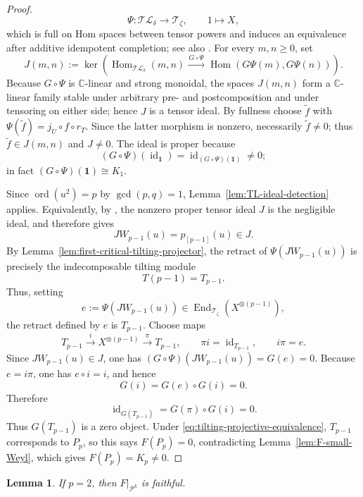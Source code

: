 \documentclass[12pt,leqno]{amsart}
\numberwithin{equation}{section}
\newtheorem{lem}[thm]{Lemma}
\newcommand{\End}{\operatorname{End}}
\newcommand{\Hom}{\operatorname{Hom}}
\newcommand{\id}{\operatorname{id}}
\newcommand{\TL}{\mathcal{TL}}
\def\C{\mathbb{C}}
\begin{document}
\begin{proof}
\begin{equation}
 \Psi:\TL_\delta\longrightarrow\mathcal T_\zeta,
 \qquad1\longmapsto X,
\end{equation}
which is full on Hom spaces between tensor powers and induces an
equivalence after additive idempotent completion; see also
\cite[Remark~2.15]{SuttonTubbenhauerWedrichZhu}.  For every $m,n\ge0$, set
\[
 J(m,n):=\ker\!\left(
 \Hom_{\TL_\delta}(m,n)\xrightarrow{\,G\circ\Psi\,}
 \Hom(G\Psi(m),G\Psi(n))\right).
\]
Because $G\circ\Psi$ is $\C$-linear and strong monoidal, the spaces
$J(m,n)$ form a $\C$-linear family stable under arbitrary pre- and
postcomposition and under tensoring on either side; hence $J$ is a tensor
ideal.  By fullness choose $\widetilde f$
with $\Psi(\widetilde f)=j_U\circ f\circ r_T$.  Since the latter morphism
is nonzero, necessarily $\widetilde f\ne0$; thus $\widetilde f\in J(m,n)$
and $J\ne0$.
The ideal is proper because
\[
 (G\circ\Psi)(\id_{\mathbf1})
 =\id_{(G\circ\Psi)(\mathbf1)}\ne0;
\]
in fact $(G\circ\Psi)(\mathbf1)\cong K_1$.

Since $\operatorname{ord}(u^2)=p$ by $\gcd(p,q)=1$,
Lemma~\ref{lem:TL-ideal-detection} applies.  Equivalently, by
\cite[Theorem~3.3]{GoodmanWenzl}, the nonzero proper tensor ideal $J$
is the negligible ideal, and \cite[Proposition~2.1]{GoodmanWenzl}
therefore gives
\[
 JW_{p-1}(u)=p_{[p-1]}(u)\in J.
\]
By Lemma~\ref{lem:first-critical-tilting-projector}, the retract of
$\Psi(JW_{p-1}(u))$ is precisely the indecomposable tilting module
\[
 T(p-1)=T_{p-1}.
\]
Thus, setting
\[
 e:=\Psi(JW_{p-1}(u))\in
 \End_{\mathcal T_\zeta}(X^{\otimes(p-1)}),
\]
the retract defined by $e$ is $T_{p-1}$.  Choose maps
\[
 T_{p-1}\xrightarrow{i}X^{\otimes(p-1)}
 \xrightarrow{\pi}T_{p-1},
 \qquad \pi i=\id_{T_{p-1}},\qquad i\pi=e.
\]
Since $JW_{p-1}(u)\in J$, one has
$(G\circ\Psi)(JW_{p-1}(u))=G(e)=0$.
Because $e=i\pi$, one has $e\circ i=i$, and hence
\[
 G(i)=G(e)\circ G(i)=0.
\]
Therefore
\[
 \id_{G(T_{p-1})}=G(\pi)\circ G(i)=0.
\]
Thus $G(T_{p-1})$ is a zero object.  Under \eqref{eq:tilting-projective-equivalence},
$T_{p-1}$ corresponds to $P_p$, so this says $F(P_p)=0$, contradicting
Lemma~\ref{lem:F-small-Weyl}, which gives $F(P_p)=K_p\ne0$.
\end{proof}

\begin{lem}\label{lem:p-two-faithful}
If $p=2$, then $F|_{\mathcal P^k}$ is faithful.
\end{lem}
\end{document}
